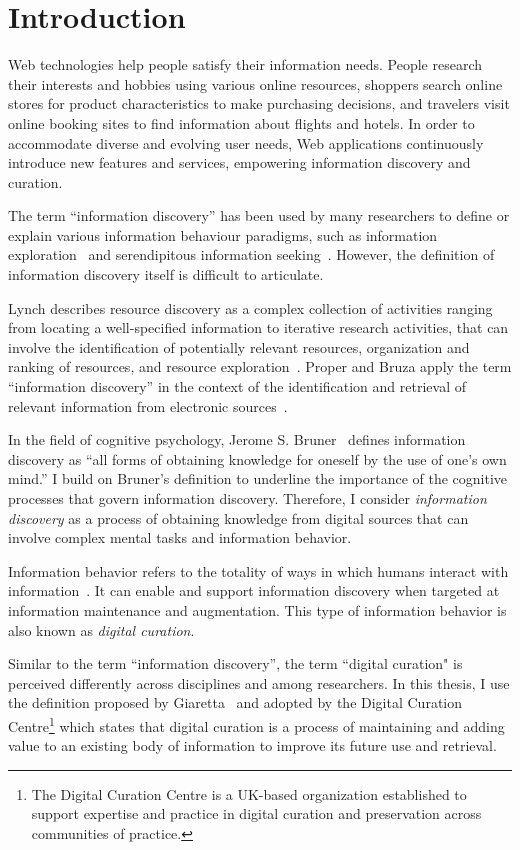 \chapter{Introduction}
\label{chapter:chapter_intro}

Web technologies help people satisfy their information needs. People research their interests and hobbies using various online resources, shoppers search online stores for product characteristics to make purchasing decisions, and travelers visit online booking sites to find information about flights and hotels. In order to accommodate diverse and evolving user needs, Web applications continuously introduce new features and services, empowering information discovery and curation. 

The term ``information discovery'' has been used by many researchers to define or explain various information behaviour paradigms, such as information exploration~\cite{waterworth1991model} and serendipitous information seeking~\cite{foster2003serendipity}. However, the definition of information discovery itself is difficult to articulate. 

Lynch describes resource discovery as a complex collection of activities ranging from locating a well-specified information to iterative research activities, that can involve the identification
of potentially relevant resources, organization and ranking of resources, and resource exploration~\cite{lynch1995networked}. Proper and Bruza apply the term ``information discovery'' in the context of  the identification and retrieval of relevant information from electronic sources~\cite{proper1999information}. 

In the field of cognitive psychology, Jerome S. Bruner~\cite{bruner1961act} defines information discovery as ``all forms of obtaining knowledge for oneself by the use of one's own mind.'' I build on Bruner's definition to underline the importance of the cognitive processes that govern information discovery. Therefore, I consider \textit{information discovery} as a process of obtaining knowledge from digital sources that can involve complex mental tasks and information behavior.  
\pagebreak

Information behavior refers to the totality of ways in which humans interact with information~\cite{wilson2000human}. It can enable and support information discovery when targeted at information maintenance and augmentation. This type of information behavior is also known as \textit{digital curation}.

Similar to the term ``information discovery'', the term ``digital curation" is perceived differently across disciplines and among researchers. In this thesis, I use the definition proposed by Giaretta~\cite{giaretta2006dcc} and adopted by the Digital Curation Centre\footnote{The Digital Curation Centre is a UK-based organization established to support expertise and practice in digital curation and preservation across communities of practice.} which states that digital curation is a process of maintaining and adding value to an existing body of information to improve its future use and retrieval.   

